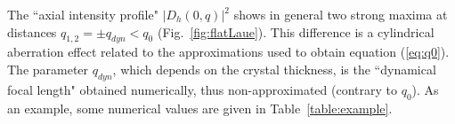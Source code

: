 \documentclass[preprint]{iucr}              %
\newcommand{\todo}[1]{{\color{red}[TODO: "#1'']}}
\newcommand{\inred}[1]{{\color{red}#1}}
\begin{document}
The ``axial intensity profile" $|D_h(0,q)|^2$ shows in general two strong maxima at distances $q_{1,2}=\pm q_{dyn} < q_0$ \inred{(Fig.~\ref{fig:flatLaue})}. This difference is a cylindrical aberration effect related to the approximations used to obtain equation (\ref{eq:q0}). The parameter $q_{dyn}$\inred{, which depends on the crystal thickness,} is the ``dynamical focal length" obtained numerically, thus non-approximated (contrary to $q_0$).
As an example, some numerical values are given in Table~\ref{table:example}. 

\end{document}
